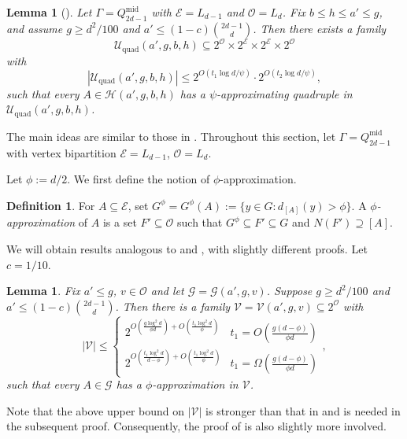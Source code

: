 \documentclass{amsart}
\newtheorem{lem}[thm]{Lemma}
\newtheorem*{lem*}{Lemma}
\theoremstyle{definition}
\newtheorem{mydef}[thm]{Definition}
\newcommand{\cO}{\mathcal{O} }
\newcommand{\cE}{\mathcal{E} }
\newcommand{\cG}{\mathcal{G} }
\newcommand{\cV}{\mathcal{V} }
\newcommand{\md}{\mathrm{mid}}
\newcommand{\0}[0]{\emptyset}
\begin{document}
\begin{lem*}[]
Let $\Gamma=Q_{2d-1}^{\mathrm{mid}}$ with $\cE=L_{d-1}$ and $\cO=L_{d}$.
Fix $b\le h\le a'\le g$, and assume $g\ge d^2/100$ and $a'\leq (1-c)\binom{2d-1}{d}$.
Then there exists a family
\[
\mathcal U_{\mathrm{quad}}(a',g,b,h)\subseteq 2^{\cO}\times 2^{\cE}\times 2^{\cE}\times 2^{\cO}
\]
with
\[
|\mathcal U_{\mathrm{quad}}(a',g,b,h)|
\le
2^{O(t_1\log d/\psi)}\cdot 2^{O(t_2\log d/\psi)},
\]
such that every $A\in \mathcal H(a',g,b,h)$ has a $\psi$-approximating quadruple in $\mathcal U_{\mathrm{quad}}(a',g,b,h)$.
\end{lem*}



The main ideas  are similar to those in \cite[Section 5]{galvin2019independent}. Throughout this section, let $\Gamma=Q_{2d-1}^{\md}$ with vertex bipartition $\cE=L_{d-1}$, $\cO=L_d$.



Let $\phi:=d/2$.
We first define the notion of $\phi$-approximation.  



\begin{mydef}\label{def:phi-approx}
    For $A\subseteq \cE$, set $G^\phi=G^\phi(A):=\{y\in G:d_{[A]}(y)>\phi\}$. A \textit{$\phi$-approximation} of $A$ is a set $F'\subseteq\cO$ such that $G^\phi\subseteq F'\subseteq G$ and $N(F')\supseteq [A]$.
\end{mydef}

We will obtain results analogous to  and , 
with slightly different proofs.
Let $c=1/10$.

\begin{lem}\label{lem:phi-approx}
    Fix $a'\leq g$, $v\in\cO$ and let $\cG=\cG(a',g,v)$. Suppose $g\geq d^2/100$ and $a'\leq (1-c)\binom{2d-1}{d}$. Then there is a family $\cV=\cV(a',g,v)\subseteq 2^{\cO}$ with
    \[
    |\cV|\leq\begin{cases}
        2^{O(\frac{g\log^2d}{\phi d})+O(\frac{t_1\log^2d}{\phi})} & t_1=O(\frac{g(d-\phi)}{\phi d})\\
        2^{O(\frac{t_1\log^2d}{d-\phi})+O(\frac{t_1\log^2d}{\phi})} & t_1=\Omega(\frac{g(d-\phi)}{\phi d})
    \end{cases},
    \]
    such that every $A\in\cG$ has a $\phi$-approximation in $\cV$.
\end{lem}

Note that the above upper bound on $|\cV|$ is stronger than that in  and is needed in the subsequent proof. Consequently, the proof of  is also slightly more involved.
\end{document}
